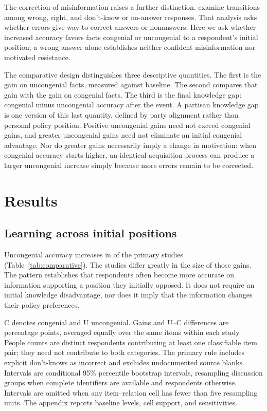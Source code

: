 \documentclass[11pt]{article}
\newcommand{\tabnote}[1]{\par\smallskip\begin{minipage}{\linewidth}\footnotesize #1\end{minipage}}
\begin{document}
The correction of misinformation raises a further distinction. \citet{luskin2026misinformation} examine transitions among wrong, right, and don't-know or no-answer responses. That analysis asks whether errors give way to correct answers or nonanswers. Here we ask whether increased accuracy favors facts congenial or uncongenial to a respondent's initial position; a wrong answer alone establishes neither confident misinformation nor motivated resistance.

The comparative design distinguishes three descriptive quantities. The first is the gain on uncongenial facts, measured against baseline. The second compares that gain with the gain on congenial facts. The third is the final knowledge gap: congenial minus uncongenial accuracy after the event. A partisan knowledge gap is one version of this last quantity, defined by party alignment rather than personal policy position. Positive uncongenial gains need not exceed congenial gains, and greater uncongenial gains need not eliminate an initial congenial advantage. Nor do greater gains necessarily imply a change in motivation: when congenial accuracy starts higher, an identical acquisition process can produce a larger uncongenial increase simply because more errors remain to be corrected.



\section{Results}

\subsection{Learning across initial positions}

Uncongenial accuracy increases in \positiveGainStudies{} of the \primaryStudies{} primary studies (Table~\ref{tab:comparative}). The studies differ greatly in the size of those gains. The pattern establishes that respondents often become more accurate on information supporting a position they initially opposed. It does not require an initial knowledge disadvantage, nor does it imply that the information changes their policy preferences.

\begin{table}[!htbp]
\centering\scriptsize
\setlength{\tabcolsep}{3.5pt}
\caption{Paired changes on the same facts across baseline policy positions.}
\label{tab:comparative}

\tabnote{C denotes congenial and U uncongenial. Gains and U--C differences are percentage points, averaged equally over the same items within each study. People counts are distinct respondents contributing at least one classifiable item pair; they need not contribute to both categories. The primary rule includes explicit don't-knows as incorrect and excludes undocumented source blanks. Intervals are conditional 95\% percentile bootstrap intervals, resampling discussion groups when complete identifiers are available and respondents otherwise. Intervals are omitted when any item--relation cell has fewer than five resampling units. The appendix reports baseline levels, cell support, and sensitivities.}
\end{table}
\end{document}
